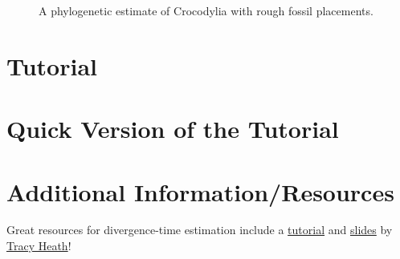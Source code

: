\documentclass{article}
\begin{document}
    \begin{figure}[htbp]
        \centering
        \caption{A phylogenetic estimate of Crocodylia with rough fossil placements.}
        \label{fig:crocFossils}
    \end{figure}

\section{Tutorial}
\newcommand{\step}[2]{\addtocounter{stepCounter}{1} {\bf \hypertarget{step\arabic{stepCounter}}{Step \arabic{stepCounter}:}}\xspace #2\par}
\newcommand{\intermediate}[1]{#1}


\newpage
\section{Quick Version of the Tutorial}
\setcounter{stepCounter}{0}
\renewcommand{\step}[2]{\addtocounter{stepCounter}{1} {\bf \hyperlink{step\arabic{stepCounter}}{Step \arabic{stepCounter}}:}\xspace #1\par}
\renewcommand{\intermediate}[1]{}


\newpage
\section{Additional Information/Resources}
Great resources for divergence-time estimation include a
\href{http://treethinkers.org/divergence-time-estimation-using-beast/}{tutorial}
and
\href{https://molevol.mbl.edu/wiki/images/6/6f/Bodega_2013_divtime_lecture.pdf}{slides}
by \href{http://phylo.bio.ku.edu/content/tracy-heath}{Tracy Heath}!

\newpage

\end{document}
